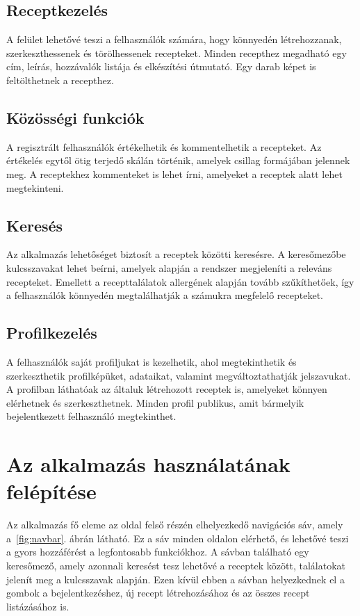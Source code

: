 \subsection{Receptkezelés}
A felület lehetővé teszi a felhasználók számára, hogy könnyedén létrehozzanak, szerkeszthessenek és törölhessenek recepteket. Minden recepthez megadható egy cím, leírás, hozzávalók listája és elkészítési útmutató. Egy darab képet is feltölthetnek a recepthez. 

\subsection{Közösségi funkciók}

A regisztrált felhasználók értékelhetik és kommentelhetik a recepteket. Az értékelés egytől ötig terjedő skálán történik, amelyek csillag formájában jelennek meg. A receptekhez kommenteket is lehet írni, amelyeket a receptek alatt lehet megtekinteni. 
\subsection{Keresés}

Az alkalmazás lehetőséget biztosít a receptek közötti keresésre. A keresőmezőbe kulcsszavakat lehet beírni, amelyek alapján a rendszer megjeleníti a releváns recepteket. Emellett a recepttalálatok allergének alapján tovább szűkíthetőek, így a felhasználók könnyedén megtalálhatják a számukra megfelelő recepteket.

\subsection{Profilkezelés}

A felhasználók saját profiljukat is kezelhetik, ahol megtekinthetik és szerkeszthetik profilképüket, adataikat, valamint megváltoztathatják jelszavukat. A profilban láthatóak az általuk létrehozott receptek is, amelyeket könnyen elérhetnek és szerkeszthetnek. Minden profil publikus, amit bármelyik bejelentkezett felhasználó megtekinthet. 


\section{Az alkalmazás használatának felépítése}

Az alkalmazás fő eleme az oldal felső részén elhelyezkedő navigációs sáv, amely a~\ref{fig:navbar}. ábrán látható. Ez a sáv minden oldalon elérhető, és lehetővé teszi a gyors hozzáférést a legfontosabb funkciókhoz. A sávban található egy keresőmező, amely azonnali keresést tesz lehetővé a receptek között, találatokat jelenít meg a kulcsszavak alapján. Ezen kívül ebben a sávban helyezkednek el a gombok a bejelentkezéshez, új recept létrehozásához és az összes recept listázásához is.

